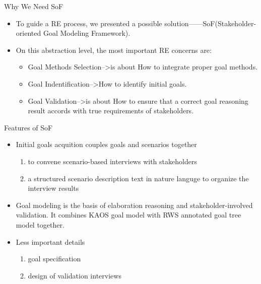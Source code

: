\documentclass{beamer}
\begin{document}
\begin{frame}{Why We Need SoF}          %
  \begin{itemize}
  \item
    To guide a RE process, we presented a possible solution——SoF(Stakeholder-oriented Goal Modeling Framework).
  \item 
    On this abstraction level, the most important RE concerns are:
    \begin{itemize}
    \item Goal Methods Selection-->is about How to integrate proper goal methods.
    \item Goal Indentification-->How to identify initial goals.
    \item Goal Validation-->is about How to ensure that a correct goal reasoning result accords with true requirements of stakeholders. 
    \end{itemize}
  \end{itemize}
\end{frame}

\begin{frame}{Features of SoF}             %
  \begin{itemize}
  \item Initial goals acquition couples goals and scenarios together
    \begin{enumerate}
    \item to convene scenario-based interviews with stakeholders
    \item a structured scenario description text in nature languge to organize the interview results
    \end{enumerate}
  \item Goal modeling is the basis of elaboration reasoning  and stakeholder-involved validation. It combines KAOS goal model with RWS annotated goal tree model together.
  \item Less important details
    \begin{enumerate}
    \item goal specification 
    \item design of validation interviews
    \end{enumerate}
  \end{itemize}
\end{frame}
\end{document}

